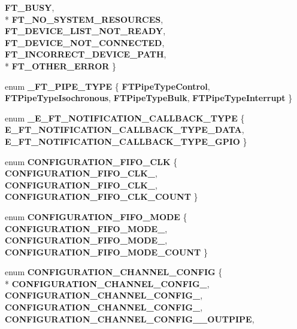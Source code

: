 \begin{DoxyCompactItemize}
{\bf F\+T\+\_\+\+B\+U\+SY}, 
\\*
{\bf F\+T\+\_\+\+N\+O\+\_\+\+S\+Y\+S\+T\+E\+M\+\_\+\+R\+E\+S\+O\+U\+R\+C\+ES}, 
{\bf F\+T\+\_\+\+D\+E\+V\+I\+C\+E\+\_\+\+L\+I\+S\+T\+\_\+\+N\+O\+T\+\_\+\+R\+E\+A\+DY}, 
{\bf F\+T\+\_\+\+D\+E\+V\+I\+C\+E\+\_\+\+N\+O\+T\+\_\+\+C\+O\+N\+N\+E\+C\+T\+ED}, 
{\bf F\+T\+\_\+\+I\+N\+C\+O\+R\+R\+E\+C\+T\+\_\+\+D\+E\+V\+I\+C\+E\+\_\+\+P\+A\+TH}, 
\\*
{\bf F\+T\+\_\+\+O\+T\+H\+E\+R\+\_\+\+E\+R\+R\+OR}
 \}
\item 
enum {\bf \+\_\+\+F\+T\+\_\+\+P\+I\+P\+E\+\_\+\+T\+Y\+PE} \{ {\bf F\+T\+Pipe\+Type\+Control}, 
{\bf F\+T\+Pipe\+Type\+Isochronous}, 
{\bf F\+T\+Pipe\+Type\+Bulk}, 
{\bf F\+T\+Pipe\+Type\+Interrupt}
 \}
\item 
enum {\bf \+\_\+\+E\+\_\+\+F\+T\+\_\+\+N\+O\+T\+I\+F\+I\+C\+A\+T\+I\+O\+N\+\_\+\+C\+A\+L\+L\+B\+A\+C\+K\+\_\+\+T\+Y\+PE} \{ {\bf E\+\_\+\+F\+T\+\_\+\+N\+O\+T\+I\+F\+I\+C\+A\+T\+I\+O\+N\+\_\+\+C\+A\+L\+L\+B\+A\+C\+K\+\_\+\+T\+Y\+P\+E\+\_\+\+D\+A\+TA}, 
{\bf E\+\_\+\+F\+T\+\_\+\+N\+O\+T\+I\+F\+I\+C\+A\+T\+I\+O\+N\+\_\+\+C\+A\+L\+L\+B\+A\+C\+K\+\_\+\+T\+Y\+P\+E\+\_\+\+G\+P\+IO}
 \}
\item 
enum {\bf C\+O\+N\+F\+I\+G\+U\+R\+A\+T\+I\+O\+N\+\_\+\+F\+I\+F\+O\+\_\+\+C\+LK} \{ {\bf C\+O\+N\+F\+I\+G\+U\+R\+A\+T\+I\+O\+N\+\_\+\+F\+I\+F\+O\+\_\+\+C\+L\+K\+\_}, 
{\bf C\+O\+N\+F\+I\+G\+U\+R\+A\+T\+I\+O\+N\+\_\+\+F\+I\+F\+O\+\_\+\+C\+L\+K\+\_}, 
{\bf C\+O\+N\+F\+I\+G\+U\+R\+A\+T\+I\+O\+N\+\_\+\+F\+I\+F\+O\+\_\+\+C\+L\+K\+\_\+\+C\+O\+U\+NT}
 \}
\item 
enum {\bf C\+O\+N\+F\+I\+G\+U\+R\+A\+T\+I\+O\+N\+\_\+\+F\+I\+F\+O\+\_\+\+M\+O\+DE} \{ {\bf C\+O\+N\+F\+I\+G\+U\+R\+A\+T\+I\+O\+N\+\_\+\+F\+I\+F\+O\+\_\+\+M\+O\+D\+E\+\_}, 
{\bf C\+O\+N\+F\+I\+G\+U\+R\+A\+T\+I\+O\+N\+\_\+\+F\+I\+F\+O\+\_\+\+M\+O\+D\+E\+\_}, 
{\bf C\+O\+N\+F\+I\+G\+U\+R\+A\+T\+I\+O\+N\+\_\+\+F\+I\+F\+O\+\_\+\+M\+O\+D\+E\+\_\+\+C\+O\+U\+NT}
 \}
\item 
enum {\bf C\+O\+N\+F\+I\+G\+U\+R\+A\+T\+I\+O\+N\+\_\+\+C\+H\+A\+N\+N\+E\+L\+\_\+\+C\+O\+N\+F\+IG} \{ \\*
{\bf C\+O\+N\+F\+I\+G\+U\+R\+A\+T\+I\+O\+N\+\_\+\+C\+H\+A\+N\+N\+E\+L\+\_\+\+C\+O\+N\+F\+I\+G\+\_}, 
{\bf C\+O\+N\+F\+I\+G\+U\+R\+A\+T\+I\+O\+N\+\_\+\+C\+H\+A\+N\+N\+E\+L\+\_\+\+C\+O\+N\+F\+I\+G\+\_}, 
{\bf C\+O\+N\+F\+I\+G\+U\+R\+A\+T\+I\+O\+N\+\_\+\+C\+H\+A\+N\+N\+E\+L\+\_\+\+C\+O\+N\+F\+I\+G\+\_}, 
{\bf C\+O\+N\+F\+I\+G\+U\+R\+A\+T\+I\+O\+N\+\_\+\+C\+H\+A\+N\+N\+E\+L\+\_\+\+C\+O\+N\+F\+I\+G\+\_\+\_\+\+O\+U\+T\+P\+I\+PE}, 

\end{DoxyCompactItemize}
